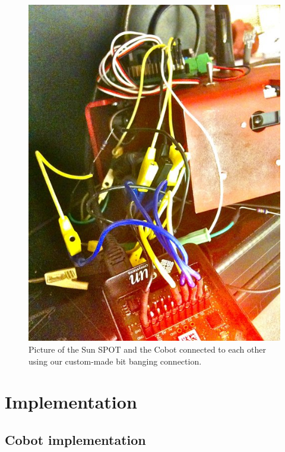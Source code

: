 \documentclass[a4paper,10pt]{article} %
\begin{document}
\begin{figure}[H]
\label{fig:cobot-sun-spot}
\centering
\includegraphics[scale=0.5]{img/cobot_and_sunspot.jpg}
\caption{Picture of the Sun SPOT and the Cobot connected to each other using our
custom-made bit banging connection.}
\end{figure}




\pagebreak

\section{Implementation} %
\label{sec:Implementation}

\subsection{Cobot implementation} %
\label{sub:Cobot implementation}
\end{document}
